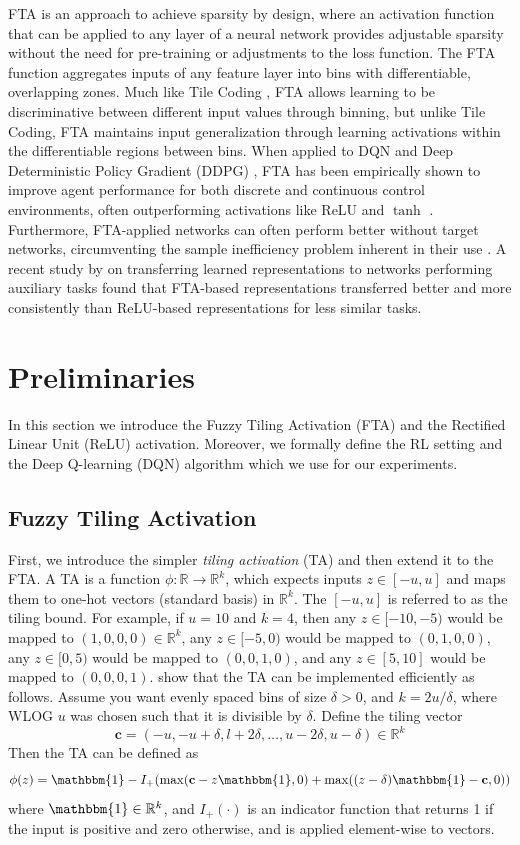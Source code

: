 \documentclass{article}
\newcommand{\RR}{\mathbb{R}}
\begin{document}
FTA is an approach to achieve sparsity by design,
where an activation function that can be applied to any layer of a neural network provides adjustable sparsity without the need for pre-training or adjustments to the loss function.
The FTA function aggregates inputs of any feature layer into bins with differentiable, overlapping zones. Much like Tile Coding \cite[]{tilecoding},
FTA allows learning to be discriminative between different input values through binning, but unlike Tile Coding,
FTA maintains input generalization through learning activations within the differentiable regions between bins.
When applied to DQN and Deep Deterministic Policy Gradient (DDPG) \cite[]{ddpg},
FTA has been empirically shown to improve agent performance for both discrete and continuous control environments,
often outperforming activations like ReLU and $\tanh$ \cite[]{pan2019fuzzy}. Furthermore, FTA-applied networks can often perform better without target networks,
circumventing the sample inefficiency problem inherent in their use \cite[]{pan2019fuzzy}.
A recent study by \cite{nnrep} on transferring learned representations to networks performing auxiliary tasks found that FTA-based representations
transferred better and more consistently than ReLU-based representations for less similar tasks.

\section{Preliminaries} \label{sec:prelims}
In this section we introduce the Fuzzy Tiling Activation (FTA) and the Rectified Linear Unit (ReLU) activation.
Moreover, we formally define the RL setting and the Deep Q-learning (DQN) algorithm which we use for our experiments.

\subsection{Fuzzy Tiling Activation}
First, we introduce the simpler \textit{tiling activation} (TA) and then extend it to the FTA.
A TA is a function $\phi: \RR \to \RR^k$, which expects inputs $z \in [-u, u]$ and maps them to one-hot vectors (standard basis) in $\RR^k$.
The $[-u, u]$ is referred to as the tiling bound.
For example, if $u=10$ and $k=4$, then any $z \in [-10,-5)$ would be mapped to $(1, 0 ,0, 0) \in \RR^k$, any $z \in [-5, 0)$ would be mapped to $(0, 1, 0, 0)$, any $z \in [0, 5)$ would be mapped to $(0, 0, 1, 0)$, and any $z \in [5, 10]$ would be mapped to $(0, 0, 0, 1)$.
\cite{pan2019fuzzy} show that the TA can be implemented efficiently as follows.
Assume you want evenly spaced bins of size $\delta > 0$, and $k = 2 u/ \delta$, where WLOG $u$ was chosen such that it is divisible by $\delta$.
Define the tiling vector
$$\mathbf{c} = (-u, -u + \delta, l + 2 \delta, \dots, u - 2 \delta, u - \delta) \in \RR^k$$
Then the TA can be defined as
$$\phi(z) = \mathbbm{1} - I_+(\max(\mathbf{c} - z\mathbbm{1}, 0) + \max((z -\delta)\mathbbm{1} - \mathbf{c}, 0))$$
where $\mathbbm{1} \in \RR^k$, and $I_+(\cdot)$ is an indicator function that returns 1 if the input is positive and zero otherwise, and is applied element-wise to vectors.
\end{document}

